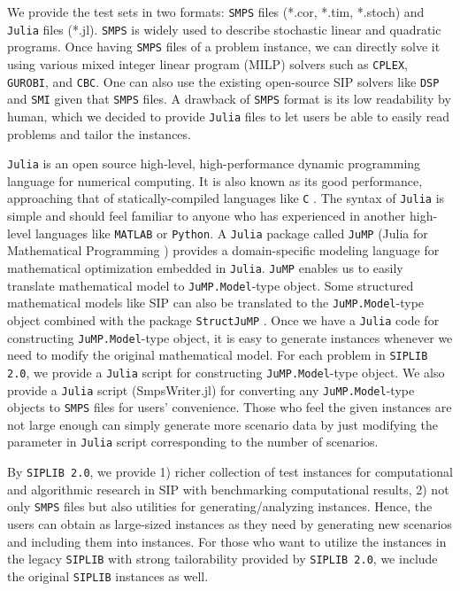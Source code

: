 We provide the test sets in two formats: \texttt{SMPS} files (*.cor, *.tim, *.stoch) and \texttt{Julia} files (*.jl). \texttt{SMPS} is widely used to describe stochastic linear and quadratic programs. Once having \texttt{SMPS} files of a problem instance, we can directly solve it using various mixed integer linear program (MILP) solvers such as \texttt{CPLEX}, \texttt{GUROBI}, and \texttt{CBC}. One can also use the existing open-source SIP solvers like \texttt{DSP} \cite{journal:KZ2015} and \texttt{SMI} \cite{web:SMI} given that \texttt{SMPS} files. A drawback of \texttt{SMPS} format is its low readability by human, which we decided to provide \texttt{Julia} files to let users be able to easily read problems and tailor the instances.

\texttt{Julia} is an open source high-level, high-performance dynamic programming language for numerical computing. It is also known as its good performance, approaching that of statically-compiled languages like \texttt{C} \cite{journal:BEKS2017}. The syntax of \texttt{Julia} is simple and should feel familiar to anyone who has experienced in another high-level languages like \texttt{MATLAB} or \texttt{Python}. A \texttt{Julia} package called \texttt{JuMP} (Julia for Mathematical Programming \cite{web:JuMP}) provides a domain-specific modeling language for mathematical optimization embedded in \texttt{Julia}. \texttt{JuMP} enables us to easily translate mathematical model to \texttt{JuMP.Model}-type object. Some structured mathematical models like SIP can also be translated to the \texttt{JuMP.Model}-type object combined with the package \texttt{StructJuMP} \cite{web:StructJuMP}. Once we have a \texttt{Julia} code for constructing \texttt{JuMP.Model}-type object, it is easy to generate instances whenever we need to modify the original mathematical model. For each problem in \texttt{SIPLIB 2.0}, we provide a \texttt{Julia} script for constructing \texttt{JuMP.Model}-type object. We also provide a \texttt{Julia} script (SmpsWriter.jl) for converting any \texttt{JuMP.Model}-type objects to \texttt{SMPS} files for users' convenience. Those who feel the given instances are not large enough can simply generate more scenario data by just modifying the parameter in \texttt{Julia} script corresponding to the number of scenarios.

By \texttt{SIPLIB 2.0}, we provide 1) richer collection of test instances for computational and algorithmic research in SIP with benchmarking computational results, 2) not only \texttt{SMPS} files but also utilities for generating/analyzing instances. Hence, the users can obtain as large-sized instances as they need by generating new scenarios and including them into instances. For those who want to utilize the instances in the legacy \texttt{SIPLIB} with strong tailorability provided by \texttt{SIPLIB 2.0}, we include the original \texttt{SIPLIB} instances as well.

